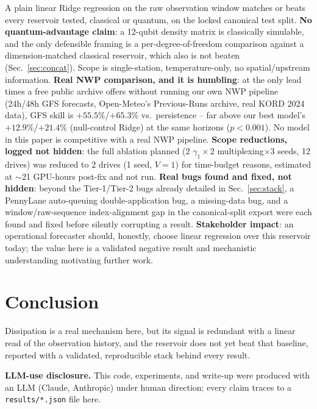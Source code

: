 \documentclass[11pt]{article}
\begin{document}
A plain linear Ridge regression on the raw observation window matches or beats every reservoir
tested, classical or quantum, on the locked canonical test split. \textbf{No quantum-advantage
claim}: a 12-qubit density matrix is classically simulable, and the only defensible framing is a
per-degree-of-freedom comparison against a dimension-matched classical reservoir, which also is
not beaten (Sec.~\ref{sec:concat}). Scope is single-station, temperature-only, no spatial/upstream
information. \textbf{Real NWP comparison, and it is humbling}: at the only lead times a free
public archive offers without running our own NWP pipeline (24h/48h GFS forecasts, Open-Meteo's
Previous-Runs archive, real KORD 2024 data), GFS skill is $+55.5\%$/$+65.3\%$ vs.\ persistence --
far above our best model's $+12.9\%$/$+21.4\%$ (null-control Ridge) at the same horizons
($p{<}0.001$). No model in this paper is competitive with a real NWP pipeline. \textbf{Scope
reductions, logged not hidden}: the full ablation planned (2
$\gamma_1\times$2 multiplexing$\times$3 seeds, 12 drives) was reduced to 2 drives (1 seed,
$V{=}1$) for time-budget reasons, estimated at $\sim$21 GPU-hours post-fix and not run.
\textbf{Real bugs found and fixed, not hidden}: beyond the Tier-1/Tier-2 bugs already detailed in
Sec.~\ref{sec:stack}, a PennyLane auto-queuing double-application bug, a missing-data bug, and a
window/raw-sequence index-alignment gap in the canonical-split export were each found and fixed
before silently corrupting a result. \textbf{Stakeholder impact}: an operational forecaster
should, honestly, choose linear regression over this reservoir today; the
value here is a validated negative result and mechanistic understanding motivating further work.

\section{Conclusion}
Dissipation is a real mechanism here, but its signal is redundant with a linear read of the
observation history, and the reservoir does not yet beat that baseline, reported with a validated,
reproducible stack behind every result.

\noindent\textbf{LLM-use disclosure.} This code, experiments, and write-up were produced with an
LLM (Claude, Anthropic) under human direction; every claim traces to a \texttt{results/*.json}
file here.
\end{document}
